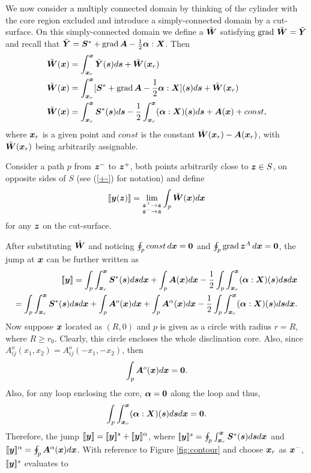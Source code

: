 \documentclass[11pt,letterpaper]{article}
\begin{document}
We now consider a multiply connected domain by thinking of the cylinder with the core region excluded and introduce a simply-connected domain by a cut-surface. On this simply-connected domain we define a $\tilde{\bfW}$ satisfying $\grad \, \tilde{\bfW} = \tilde{\bfY}$ and recall that $\tilde{\bfY} = \bfS^{*} + \grad \bfA - \frac{1}{2}\bfalpha:\bfX$. Then
\begin{eqnarray}\label{eqn:tildeW}
&\tilde{\bfW}(\bfx) = \int_{\bfx_r}^{\bfx} \tilde{\bfY}(\bfs) d\bfs + \tilde{\bfW}(\bfx_r)\\
&\tilde{\bfW}(\bfx) = \int_{\bfx_r}^{\bfx} [\bfS^{*} + \grad \bfA - \frac{1}{2}\bfalpha:\bfX](\bfs) d\bfs + \tilde{\bfW}(\bfx_r) \\
&\tilde{\bfW}(\bfx) = \int_{\bfx_r}^{\bfx}\bfS^{*}(\bfs) d\bfs -\frac{1}{2} \int_{\bfx_r}^{\bfx}(\bfalpha:\bfX)(\bfs) d\bfs + \bfA(\bfx) + const,
\end{eqnarray}
where $\bfx_r$ is a given point and $const$ is the constant $\tilde{\bfW}(\bfx_r)-\bfA(\bfx_r)$, with $\tilde{\bfW}(\bfx_r)$ being arbitrarily assignable. 

Consider a path $p$ from $\bfz^-$ to $\bfz^+$, both points arbitrarily close to $\bfz \in S$, on opposite sides of $S$ (see (\ref{+-}) for notation) and define 
\[
[\![\bfy (\bfz) ] \!] = \lim_{\substack{\bfz^+ \rightarrow \bfz\\ \bfz^- \rightarrow \bfz}} \int_p \tilde{\bfW}(\bfx) d\bfx
\]
for any $\bfz$ on the cut-surface.

After substituting $\tilde{\bfW}$ and noticing $\oint_p const \,d\bfx = \bf0$ and $\oint_p \grad \bfz^A \,d\bfx = \bf0$, the jump at $\bfx$ can be further written as 
\begin{eqnarray} \label{eqn:jump_y}
[\![\bfy]\!] = \int_p \int_{\bfx_r}^{\bfx} \bfS^{*}(\bfs) d\bfs d\bfx + \int_p \bfA(\bfx)d\bfx - \frac{1}{2} \int_p \int_{\bfx_r}^{\bfx} (\bfalpha:\bfX)(\bfs) d\bfs d\bfx \nonumber \\
= \int_p \int_{\bfx_r}^{\bfx} \bfS^{*}(\bfs) d\bfs d\bfx + \int_p \bfA^o(\bfx)d\bfx + \int_p \bfA^{\alpha}(\bfx)d\bfx - \frac{1}{2} \int_p \int_{\bfx_r}^{\bfx} (\bfalpha:\bfX)(\bfs) d\bfs d\bfx.
\end{eqnarray}
 Now suppose $\bfx$ located as $(R,0)$ and $p$ is given as a circle with radius $r=R$, where $R\ge r_0$. Clearly, this circle encloses the whole disclination core. Also, since $A^o_{ij}(x_1,x_2) = A^o_{ij}(-x_1,-x_2)$, then 
\begin{equation*}
\int_p \bfA^o(\bfx)d\bfx = \bf0.
\end{equation*}
Also, for any loop enclosing the core, $\bfalpha = \bf0$ along the loop and thus, 
\begin{equation*}
\int_p \int_{\bfx_r}^{\bfx} (\bfalpha:\bfX)(\bfs) d\bfs d\bfx = \bf0.
\end{equation*}
Therefore, the jump $[\![\bfy]\!] = [\![\bfy]\!]^{s}+ [\![\bfy]\!]^{\alpha}$, where $[\![\bfy]\!]^s = \oint_p \int_{\bfx_r}^{\bfx} \bfS^{*}(\bfs) d\bfs d\bfx$ and $[\![\bfy]\!]^{\alpha} = \oint_p \bfA^{\alpha}(\bfx)d\bfx$. With reference to Figure \ref{fig:contour} and choose $\bfx_r$ as $\bfx^-$, $[\![\bfy]\!]^s$ evaluates to
\end{document}

